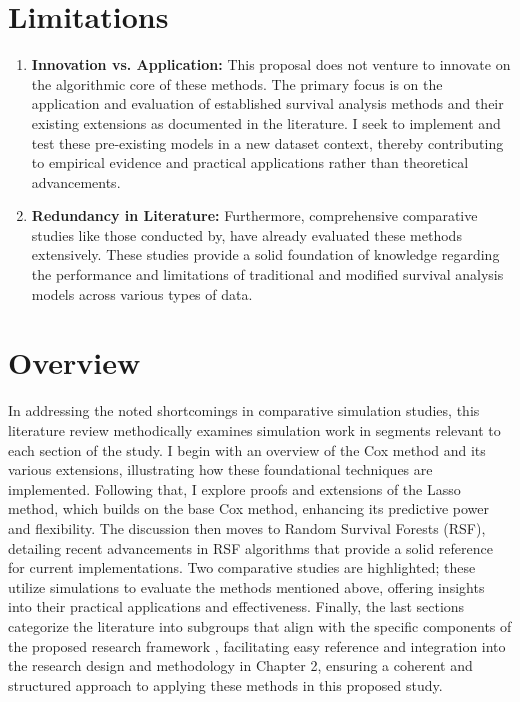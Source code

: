 \section{Limitations}
\begin{enumerate}
    \item \textbf{Innovation vs. Application:} This proposal does not venture to innovate on the algorithmic core of these methods. The primary focus is on the application and evaluation of established survival analysis methods and their existing extensions as documented in the literature. I seek to implement and test these pre-existing models in a new dataset context, thereby contributing to empirical evidence and practical applications rather than theoretical advancements.
    \item \textbf{Redundancy in Literature:} Furthermore, comprehensive comparative studies like those conducted by, \parencite{kurt_omurlu_comparisons_2009} \parencite{smith_scoping_2022} have already evaluated these methods extensively. These studies provide a solid foundation of knowledge regarding the performance and limitations of traditional and modified survival analysis models across various types of data.
\end{enumerate}

\section{Overview}
\noindent
In addressing the noted shortcomings in comparative simulation studies, this literature review methodically examines simulation work in segments relevant to each section of the study. I begin with an overview of the Cox method and its various extensions, illustrating how these foundational techniques are implemented. Following that, I explore proofs and extensions of the Lasso method, which builds on the base Cox method, enhancing its predictive power and flexibility. The discussion then moves to Random Survival Forests (RSF), detailing recent advancements in RSF algorithms that provide a solid reference for current implementations. Two comparative studies are highlighted; these utilize simulations to evaluate the methods mentioned above, offering insights into their practical applications and effectiveness. Finally, the last sections categorize the literature into subgroups that align with the specific components of the proposed research framework \parencite{pawel_pitfalls_2024} \parencite{morris_using_2019}, facilitating easy reference and integration into the research design and methodology in Chapter 2, ensuring a coherent and structured approach to applying these methods in this proposed study.
